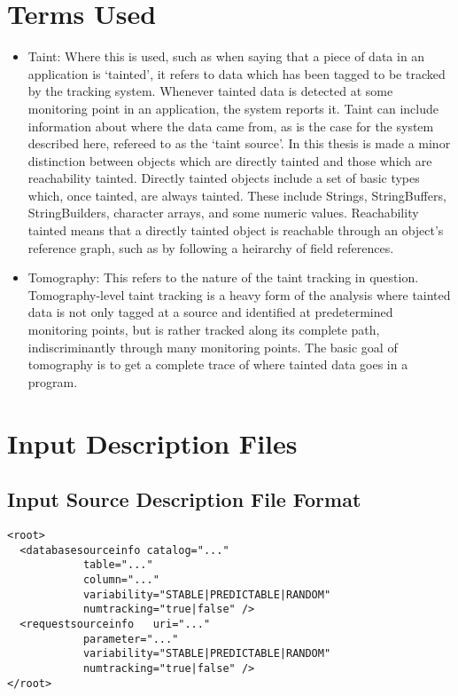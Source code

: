 \documentclass[msc,oneside]{ubcthesis}
\begin{document}
\chapter{Terms Used}
\label{cha:termsused}
\begin{itemize}
\item Taint: Where this is used, such as when saying that a piece of data in an application is `tainted', it refers to data which has been tagged to be tracked by the tracking system. Whenever tainted data is detected at some monitoring point in an application, the system reports it. Taint can include information about where the data came from, as is the case for the system described here, refereed to as the `taint source'. In this thesis is made a minor distinction between objects which are directly tainted and those which are reachability tainted. Directly tainted objects include a set of basic types which, once tainted, are always tainted. These include Strings, StringBuffers, StringBuilders, character arrays, and some numeric values. Reachability tainted means that a directly tainted object is reachable through an object's reference graph, such as by following a heirarchy of field references.
\item Tomography: This refers to the nature of the taint tracking in question. Tomography-level taint tracking is a heavy form of the analysis where tainted data is not only tagged at a source and identified at predetermined monitoring points, but is rather tracked along its complete path, indiscriminantly through many monitoring points. The basic goal of tomography is to get a complete trace of where tainted data goes in a program. 
\end{itemize}

\chapter{Input Description Files}
\label{cha:idf}

\section{Input Source Description File Format}
\begin{verbatim}
<root>
  <databasesourceinfo catalog="..." 
            table="..." 
            column="..." 
            variability="STABLE|PREDICTABLE|RANDOM"
            numtracking="true|false" />
  <requestsourceinfo   uri="..." 
            parameter="..."
            variability="STABLE|PREDICTABLE|RANDOM"
            numtracking="true|false" />
</root>
\end{verbatim}
\end{document}
